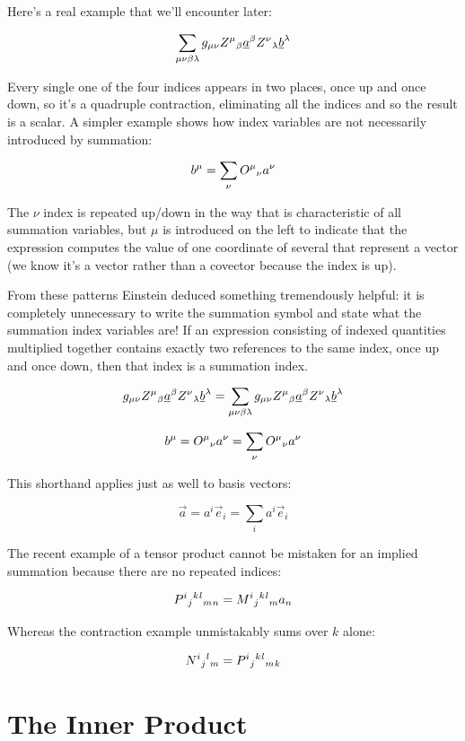 Here's a real example that we'll encounter later:

$$
\sum_{\mu\nu\beta\lambda} g_{\mu\nu} Z\indices{^\mu_\beta} \underline{a}^{\beta} Z\indices{^\nu_\lambda} \underline{b}^{\lambda}
$$

Every single one of the four indices appears in two places, once up and once down, so it's a quadruple contraction, eliminating all the indices and so the result is a scalar. A simpler example shows how index variables are not necessarily introduced by summation:

$$
b^\mu = \sum_{\nu} O\indices{^\mu_\nu} a^\nu
$$

The $\nu$ index is repeated up/down in the way that is characteristic of all summation variables, but $\mu$ is introduced on the left to indicate that the expression computes the value of one coordinate of several that represent a vector (we know it's a vector rather than a covector because the index is up).

From these patterns Einstein deduced something tremendously helpful: it is completely unnecessary to write the summation symbol and state what the summation index variables are! If an expression consisting of indexed quantities multiplied together contains exactly two references to the same index, once up and once down, then that index is a summation index.

$$
g_{\mu\nu} Z\indices{^\mu_\beta} \underline{a}^{\beta} Z\indices{^\nu_\lambda} \underline{b}^{\lambda}
=
\sum_{\mu\nu\beta\lambda} g_{\mu\nu} Z\indices{^\mu_\beta} \underline{a}^{\beta} Z\indices{^\nu_\lambda} \underline{b}^{\lambda}
$$

$$
b^\mu = O\indices{^\mu_\nu} a^\nu = \sum_{\nu} O\indices{^\mu_\nu} a^\nu
$$

This shorthand applies just as well to basis vectors:

$$
\vec{a} = a^i \vec{e}_i = \sum_{i} a^i \vec{e}_i
$$

The recent example of a tensor product cannot be mistaken for an implied summation because there are no repeated indices:

$$
P\indices{^i_j^k^l_m_n} = M\indices{^i_j^k^l_m} a_n
$$
 
Whereas the contraction example unmistakably sums over $k$ alone:

$$
N\indices{^i_j^l_m} = P\indices{^i_j^k^l_m_k}
$$

\section{The Inner Product} \label{inner-product}

